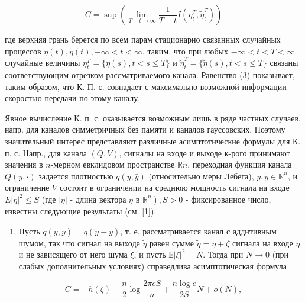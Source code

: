 \documentclass[10pt]{article}
\begin{document}
\[

C=\sup \left(\lim _{T-t \rightarrow \infty} \frac{1}{T-t} I\left(\eta_{t}^{T}, \tilde{\eta}_{t}^{T}\right)\right)

\]



где верхняя грань берется по всем парам стационарно связанных случайных процессов $\eta(t), \tilde{\eta}(t),-\infty<t<\infty$, таким, что при любых $-\infty<t<T<\infty$ случайные величины $\eta_{t}^{T}=\{\eta(s), t<s \leqslant T\}$ и $\tilde{\eta}_{t}^{T}=\{\tilde{\eta}(s), t<s \leqslant T\}$ связаны соответствующим отрезком рассматриваемого канала. Равенство (3) показывает, таким образом, что К. П. с. совпадает с максимально возможной информации скоростью передачи по этому каналу.



Явное вычисление К. п. с. оказывается возможным лишь в ряде частных случаев, напр. для каналов симметричных без памяти и каналов гауссовских. Поэтому значительный интерес представляют различные асимптотические формулы для К. п. с. Напр., для канала $(Q, V)$, сигналы на входе и выходе к-рого принимают значения в $n$-мерном евклидовом пространстве $\mathbb{R} n$, переходная функция канала $Q(y, \cdot)$ задается плотностью $q(y, \bar{y})$ (относительно меры Лебега), $y, \tilde{y} \in \mathbb{R}^{n}$, и ограничение $V$ состоит в ограничении на среднюю мощность сигнала на входе $E|\eta|^{2} \leqslant S$ (где $|\eta|$ - длина вектора $\eta$ в $\left.\mathbb{R}^{n}\right), S>0$ - фиксированное число, известны следующие результаты (см. [1]).



\begin{enumerate}

  \item Пусть $q(y, \tilde{y})=q(\tilde{y}-y)$, т. е. рассматривается канал с аддитивным шумом, так что сигнал на выходе $\tilde{\eta}$ равен сумме $\tilde{\eta}=\eta+\zeta$ сигнала на входе $\eta$ и не зависящего от него шума $\xi$, и пусть $Е|\xi|^{2}=N$. Тогда при $N \rightarrow 0$ (при слабых дополнительных условиях) справедлива асимптотическая формула

\end{enumerate}



\[

C=-h(\zeta)+\frac{n}{2} \log \frac{2 \pi e S}{n}+\frac{n \log e}{2 S} N+o(N),

\]
\end{document}

